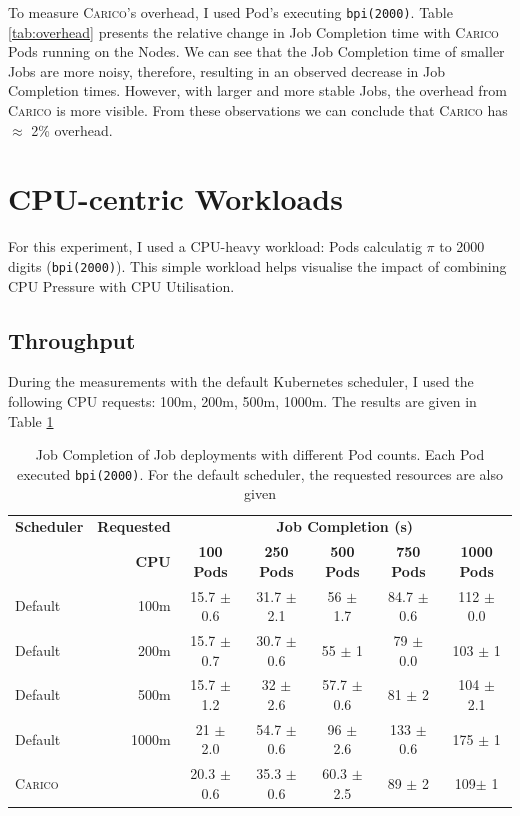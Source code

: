 To measure \textsc{Carico}'s overhead, I used Pod's executing \texttt{bpi(2000)}. Table
\ref{tab:overhead} presents the relative change in Job Completion time with
\textsc{Carico} Pods running on the Nodes. We can see that the Job Completion time of
smaller Jobs are more noisy, therefore, resulting in an observed decrease in Job
Completion times. However, with larger and more stable Jobs, the overhead from
\textsc{Carico} is more visible. From these observations we can conclude that \textsc{Carico} has
$\approx$ 2\% overhead.
%
\section{CPU-centric Workloads}
\label{sec:eval-cpu-centric}
For this experiment, I used a CPU-heavy workload: Pods calculatig $\pi$ to 2000
digits (\texttt{bpi(2000)}). This simple workload helps visualise the impact of
combining CPU Pressure with CPU Utilisation.

\subsection{Throughput}
During the measurements with the default Kubernetes scheduler, I used the
following CPU requests: 100m, 200m, 500m, 1000m. The results are given in Table
\ref{tab:pi-2000-throughput}

\begin{table}[ht!]
\centering
    \begin{tabular}{|l|r|c|c|c|c|c|}
    \hline
    \textbf{Scheduler} & \textbf{Requested} & \multicolumn{5}{c|}{\textbf{Job Completion (s)}} \\
    \cline{2-7}
    &  \textbf{CPU} & \textbf{100 Pods} & \textbf{250 Pods} & \textbf{500 Pods} & \textbf{750 Pods} & \textbf{1000 Pods} \\
    \hline
    Default & 100m & 15.7 $\pm$ 0.6 & 31.7 $\pm$ 2.1 & 56 $\pm$ 1.7 & 84.7 $\pm$
        0.6 & 112 $\pm$ 0.0 \\
    Default & 200m & 15.7 $\pm$ 0.7 & 30.7 $\pm$ 0.6 & 55 $\pm$ 1 & 79 $\pm$ 0.0
        & 103 $\pm$ 1 \\
    Default & 500m & 15.7 $\pm$ 1.2 & 32 $\pm$ 2.6 & 57.7 $\pm$ 0.6 & 81 $\pm$ 2
        & 104 $\pm$ 2.1 \\
    Default & 1000m & 21 $\pm$ 2.0 & 54.7 $\pm$ 0.6 & 96 $\pm$ 2.6 & 133 $\pm$
        0.6 & 175 $\pm$ 1 \\
    \textsc{Carico} &  & 20.3 $\pm$ 0.6 & 35.3 $\pm$ 0.6 & 60.3 $\pm$ 2.5 & 89 $\pm$ 2 &
        109$\pm$ 1 \\
    \hline
    \end{tabular}
    \caption{Job Completion of Job deployments with different Pod counts. Each
    Pod executed \texttt{bpi(2000)}. For the default scheduler, the requested
    resources are also given}
    \label{tab:pi-2000-throughput}
\end{table}

